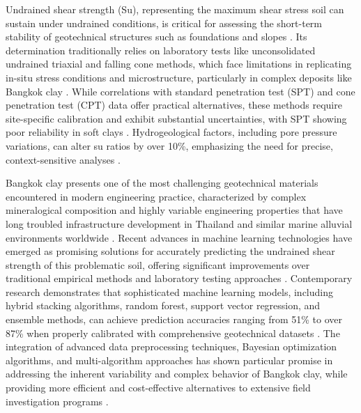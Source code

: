 \documentclass[12pt,a4paper]{article}
\begin{document}
	Undrained shear strength (Su), representing the maximum shear stress soil can sustain under undrained conditions, is critical for assessing the short-term stability of geotechnical structures such as foundations and slopes \cite{doi:10.1680/geot.1984.34.4.449}. Its determination traditionally relies on laboratory tests like unconsolidated undrained triaxial and falling cone methods, which face limitations in replicating in-situ stress conditions and microstructure, particularly in complex deposits like Bangkok clay \cite{doi:10.1680/geot.1984.34.4.449,10.1520/GTJ20170127}. While correlations with standard penetration test (SPT) and cone penetration test (CPT) data offer practical alternatives, these methods require site-specific calibration and exhibit substantial uncertainties, with SPT showing poor reliability in soft clays \cite{10.1520/GTJ20170127,ma15186385,Sepúlveda28052025}. Hydrogeological factors, including pore pressure variations, can alter su ratios by over 10\%, emphasizing the need for precise, context-sensitive analyses \cite{belcavello2024influence}.
	
	Bangkok clay presents one of the most challenging geotechnical materials encountered in modern engineering practice, characterized by complex mineralogical composition and highly variable engineering properties that have long troubled infrastructure development in Thailand and similar marine alluvial environments worldwide \cite{phai2019,Pithan_Pairojn_2020}. Recent advances in machine learning technologies have emerged as promising solutions for accurately predicting the undrained shear strength of this problematic soil, offering significant improvements over traditional empirical methods and laboratory testing approaches \cite{app121910177,Demir_Sahin_2024,doi:10.1177/03611981241278354}. Contemporary research demonstrates that sophisticated machine learning models, including hybrid stacking algorithms, random forest, support vector regression, and ensemble methods, can achieve prediction accuracies ranging from 51\% to over 87\% when properly calibrated with comprehensive geotechnical datasets \cite{Demir_Sahin_2024,doi:10.1177/03611981241278354,su12062218}. The integration of advanced data preprocessing techniques, Bayesian optimization algorithms, and multi-algorithm approaches has shown particular promise in addressing the inherent variability and complex behavior of Bangkok clay, while providing more efficient and cost-effective alternatives to extensive field investigation programs \cite{Demir_Sahin_2024,doi:10.1177/03611981241278354,app13095418}.
	
\end{document}
